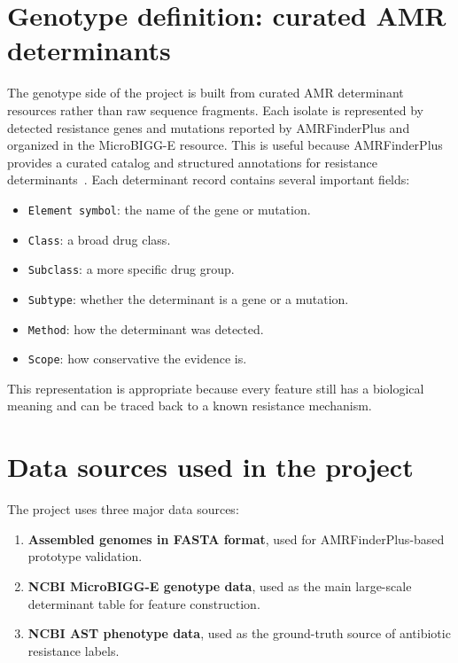 \section{Genotype definition: curated AMR determinants}

The genotype side of the project is built from curated AMR determinant resources rather than raw sequence fragments. Each isolate is represented by detected resistance genes and mutations reported by AMRFinderPlus and organized in the MicroBIGG-E resource. This is useful because AMRFinderPlus provides a curated catalog and structured annotations for resistance determinants~\citep{feldgarden2021amrfinderplus}. Each determinant record contains several important fields:

\begin{itemize}
    \item \texttt{Element symbol}: the name of the gene or mutation.
    \item \texttt{Class}: a broad drug class.
    \item \texttt{Subclass}: a more specific drug group.
    \item \texttt{Subtype}: whether the determinant is a gene or a mutation.
    \item \texttt{Method}: how the determinant was detected.
    \item \texttt{Scope}: how conservative the evidence is.
\end{itemize}

This representation is appropriate because every feature still has a biological meaning and can be traced back to a known resistance mechanism.

\section{Data sources used in the project}

The project uses three major data sources:

\begin{enumerate}[label=\arabic*.]
    \item \textbf{Assembled genomes in FASTA format}, used for AMRFinderPlus-based prototype validation.
    \item \textbf{NCBI MicroBIGG-E genotype data}, used as the main large-scale determinant table for feature construction.
    \item \textbf{NCBI AST phenotype data}, used as the ground-truth source of antibiotic resistance labels.
\end{enumerate}

